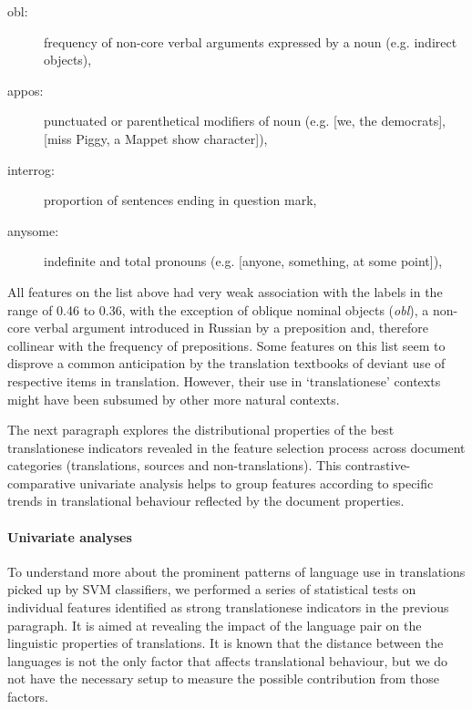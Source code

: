 \begin{description}
	\item[obl:] frequency of non-core verbal arguments expressed by a noun (e.g. indirect objects),
	\item[appos:] punctuated or parenthetical modifiers of noun (e.g.  [we, the democrats],  [miss Piggy, a Mappet show character]),
	\item[interrog:] proportion of sentences ending in question mark,
	\item[anysome:] indefinite and total pronouns (e.g.  [anyone, something, at some point]),

\end{description}

All features on the list above had very weak association with the labels in the range of 0.46 to 0.36, with the exception of oblique nominal objects (\textit{obl}), a non-core verbal argument introduced in Russian by a preposition and, therefore collinear with the frequency of prepositions. Some features on this list seem to disprove a common anticipation by the translation textbooks of deviant use of respective items in translation. However, their use in `translationese' contexts might have been subsumed by other more natural contexts.


The next paragraph explores the distributional properties of the best translationese indicators revealed in the feature selection process across document categories (translations, sources and non-translations). This contrastive-comparative univariate analysis helps to group features according to specific trends in translational behaviour reflected by the document properties. 

\paragraph{\label{par:featsunivar}Univariate analyses}
To understand more about the prominent patterns of language use in translations picked up by SVM classifiers, we performed a series of statistical tests on individual features identified as strong translationese indicators in the previous paragraph. It is aimed at revealing the impact of the language pair on the linguistic properties of translations. It is known that the distance between the languages is not the only factor that affects translational behaviour, but we do not have the necessary setup to measure the possible contribution from those factors. 
 
